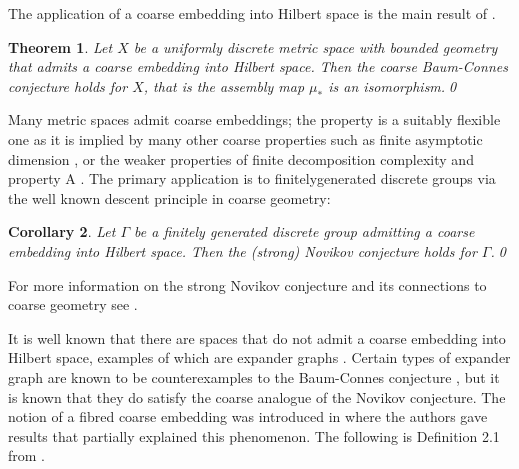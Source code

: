 \documentclass[11pt]{amsart}
\theoremstyle{plain}
\newtheorem{theorem}{Theorem}%
\newtheorem{corollary}[theorem]{Corollary}%
\theoremstyle{definition}%
\theoremstyle{remark}%
\begin{document}
The application of a coarse embedding into Hilbert space is the main result of \cite{MR1728880, MR1905840}.

\begin{theorem}
Let $X$ be a uniformly discrete metric space with bounded geometry that admits a coarse embedding into Hilbert space. Then the coarse Baum-Connes conjecture holds for $X$, that is the assembly map $\mu_{*}$ is an isomorphism.\qed
\end{theorem}

Many metric spaces admit coarse embeddings; the property is a suitably flexible one as it is implied by many other coarse properties such as finite asymptotic dimension \cite{}, or the weaker properties of finite decomposition complexity \cite{} and property A \cite{}. The primary application is to finitelygenerated discrete groups via the well known descent principle in coarse geometry:

\begin{corollary}
Let $\Gamma$ be a finitely generated discrete group admitting a coarse embedding into Hilbert space. Then the (strong) Novikov conjecture holds for $\Gamma$.\qed
\end{corollary}

For more information on the strong Novikov conjecture and its connections to coarse geometry see \cite{MR1388300, MR1905840}.

It is well known that there are spaces that do not admit a coarse embedding into Hilbert space, examples of which are expander graphs \cite{MR2569682}. Certain types of expander graph are known to be counterexamples to the Baum-Connes conjecture \cite{higsonpreprint,MR1911663,explg1,explg2,MR2568691}, but it is known that they do satisfy the coarse analogue of the Novikov conjecture. The notion of a fibred coarse embedding was introduced in \cite{FCEpaper} where the authors gave results that partially explained this phenomenon. The following is Definition 2.1 from \cite{FCEpaper}.
\end{document}
